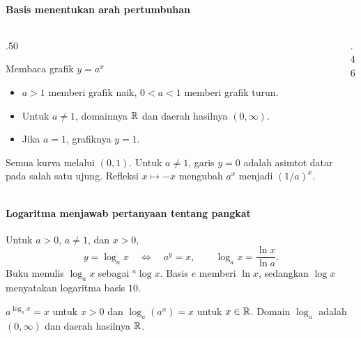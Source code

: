 \documentclass{../../kalkulus-ppt}
\begin{document}
\begin{frame}{\insertsection}
    \framesubtitle{Basis menentukan arah pertumbuhan}
    \begin{columns}[c,onlytextwidth]
        \begin{column}{.50\textwidth}
            \begin{block}{Membaca grafik $y=a^x$}
                \begin{itemize}
                    \item $a>1$ memberi grafik naik, $0<a<1$ memberi grafik turun.
                    \item Untuk $a\ne1$, domainnya $\mathbb{R}$ dan daerah hasilnya $(0,\infty)$.
                    \item Jika $a=1$, grafiknya $y=1$.
                \end{itemize}
            \end{block}
            Semua kurva melalui $(0,1)$.
            Untuk $a\ne1$, garis $y=0$ adalah asimtot datar pada salah satu ujung.
            Refleksi $x\mapsto -x$ mengubah $a^x$ menjadi $(1/a)^x$.
        \end{column}
        \begin{column}{.46\textwidth}
            \centering
        \end{column}
    \end{columns}
\end{frame}

\begin{frame}{\insertsection}
    \framesubtitle{Logaritma menjawab pertanyaan tentang pangkat}
    \begin{definisi}
        Untuk $a>0$, $a\ne1$, dan $x>0$,
        \[
            y=\log_a x\quad\Longleftrightarrow\quad a^y=x,
            \qquad \log_a x=\frac{\ln x}{\ln a}.
        \]
        Buku menulis $\log_a x$ sebagai \({}^a\!\log x\). Basis $e$ memberi $\ln x$,
        sedangkan $\log x$ menyatakan logaritma basis $10$.
    \end{definisi}
    \begin{teorema}
        $a^{\log_a x}=x$ untuk $x>0$ dan $\log_a(a^x)=x$ untuk $x\in\mathbb{R}$.
        Domain $\log_a$ adalah $(0,\infty)$ dan daerah hasilnya $\mathbb{R}$.
    \end{teorema}
\end{frame}
\end{document}
